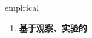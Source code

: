 
\begin{frame}
{\huge empirical}
\begin{center}
\begin{enumerate}\Large
  \item \textbf{基于观察、实验的}
\end{enumerate}
\end{center}
\end{frame}

